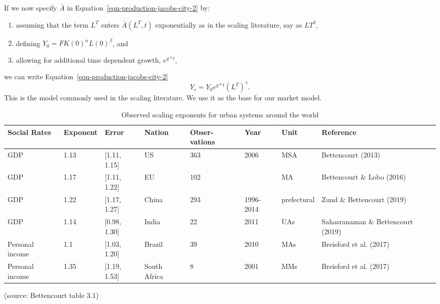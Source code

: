 {If we now specify $\bar A$ in Equation~\ref{eqn-production-jacobs-city-2} by: \begin{enumerate}
    \item   assuming that the term $L^T$ enters $\bar A(L^T, t)$ exponentially as in the scaling literature, say as $LT^\delta$,  
    \item defining $Y_0=F K(0)^\alpha L(0)^\beta$, and 
    \item allowing  for additional time dependent growth, $e^{g*t}$,
\end{enumerate}
we can write Equation~\ref{eqn-production-jacobs-city-2} 
\begin{equation}Y_c = Y_0e^{g*t}(L^T)^\gamma. \label{eqn-production-jacobs-scale}
\end{equation}
This is the model commonly used in the scaling literature. We use it as the base for our market model. 



\begin{table}[htb]\small
\centering
\begin{tabular}{|p{1.5cm}|l|l|p{1.5cm}|p{1.4cm}|p{}|l|p{2.5cm}|}\hline
\textbf{Social Rates} & \textbf{Exponent} & \textbf{Error} & \textbf{Nation} & \textbf{Obser-vations} & \textbf{Year} & \textbf{Unit} & \textbf{Reference} \\ \hline   
GDP             & 1.13 & [1.11, 1.15]  & US           & 363 & 2006        & MSA  & Bettencourt (2013)                 \\ \hline
GDP             & 1.17 & [1.11, 1.22]  & EU           & 102 &             & MA   & Bettencourt  \& Lobo        (2016) \\ \hline
GDP             & 1.22 & [1.17, 1.27]  & China        & 293 & 1996-2014   & prefectural & Zund  \& Bettencourt (2019) \\ \hline
GDP             & 1.14 & [0.98, 1.30]  & India        & 22  & 2011        & UAs  & Sahasranaman \& Bettencourt (2019) \\ \hline
Personal income & 1.1  & [1.03, 1.20]  & Brazil       & 39  & 2010        & MAs  & Breisford et al.  (2017)           \\ \hline
Personal income & 1.35 & [1.19, 1.53]  & South Africa & 8   & 2001        & MMs  & Breisford et al.  (2017)           \\ \hline
\end{tabular}
\caption[Observed scaling exponents]{Observed scaling exponents for urban systems around the world} \label{table-scaling-exponents} (source: Bettencourt \cite{bettencourtIntroductionUrbanScience2021} table 3.1)


\end{table}}
